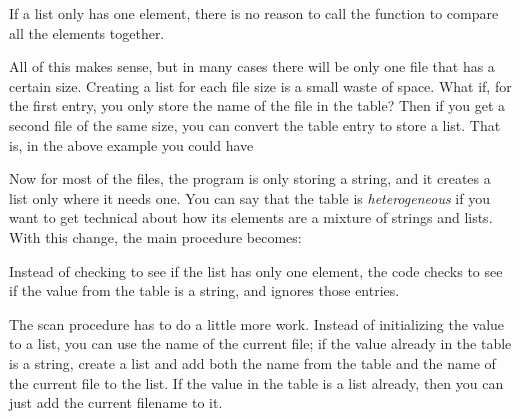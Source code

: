 
If a list only has one element, there is no reason to call the function
to compare all the elements together. 

All of this makes sense, but in many cases there will be only one file
that has a certain size. Creating a list for each file size is a small
waste of space. What if, for the first entry, you only store the name
of the file in the table? Then if you get a second file of the same
size, you can convert the table entry to store a list. That is, in the
above example you could have 


Now for most of the files, the program is only storing a string, and it
creates a list only where it needs one. You can say that the table is
\textit{heterogeneous} if you want to get technical about how its
elements are a mixture of strings and lists. With this change, the main
procedure becomes:


Instead of checking to see if the list has only one element, the code
checks to see if the value from the table is a string, and ignores
those entries.

The scan procedure has to do a little more work. Instead of initializing
the value to a list, you can use the name of the current file; if the
value already in the table is a string, create a list and add both the
name from the table and the name of the current file to the list. If
the value in the table is a list already, then you can just add the
current filename to it.

